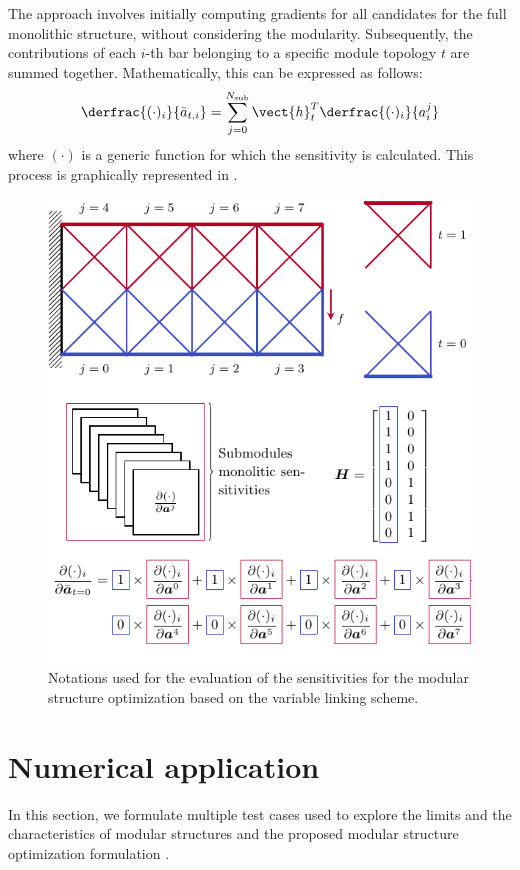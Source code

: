 The approach involves initially computing gradients for all candidates for the full monolithic structure, without considering the modularity. Subsequently, the contributions of each $i$-th bar belonging to a specific module topology $t$ are summed together. Mathematically, this can be expressed as follows:
\begin{equation}
    \derfrac{(\cdot)_i}{\bar{a}_{t,i}} =  \sum_{j=0}^{N_\text{sub}} \vect{h}_t^T \derfrac{(\cdot)_i}{a^j_i} 
    \label{eq:05_VL_grad}
\end{equation}
where $(\cdot)$ is a generic function for which the sensitivity is calculated. This process is graphically represented in .

\begin{figure}
    \centering
    \includegraphics{figures/05_cellular_opt/00_modules_VL_grad/modules_grad.pdf}
    \caption{Notations used for the evaluation of the sensitivities for the modular structure optimization based on the variable linking scheme.}
    \label{fig:05_VL_grad}
\end{figure}

\section{Numerical application} \label{sec:05_02}
In this section, we formulate multiple test cases used to explore the limits and the characteristics of modular structures and the proposed modular structure optimization formulation .

